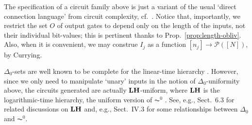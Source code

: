\documentclass{lmcs}
\begin{document}
%
%

\noindent
The specification of a circuit family above is just a variant of the usual `direct connection language' from circuit complexity, cf.~\cite{Ruzzo81:on-unif-circ-comp}. Notice that, importantly, we restrict the set $O$ of output gates to depend only on the length of the inputs, not their individual bit-values;
this is pertinent thanks to Prop.~\ref{prop:length-obliv}.
Also, when it is convenient, we may construe $I_j$ as a function $[n_j] \to \mathcal P ([N])$, by Currying.


\begin{remark}
	\label{rmk:delzer-aczer}
	$\Delta_0$-sets are well known to be complete for the linear-time hierarchy \cite{Wrathall76:PH+LTH}. However, since we only need to manipulate `unary' inputs in the notion of $\Delta_0$-uniformity above, the circuits generated are actually $\mathbf{LH}$-uniform, where $\mathbf{LH}$ is the logarithmic-time hierarchy, the uniform version of $\AC^0$ \cite{BarImmStrauS90:uniformity-nc1}.
	See, e.g., \cite{CloKra02} Sect.~6.3 for related discussions on $\mathbf{LH}$ and, e.g., \cite{Cook:2010:LFP:1734064} Sect.~IV.3 for some relationships between $\Delta_0$ and $\AC^0$.
	\end{remark}
\end{document}
